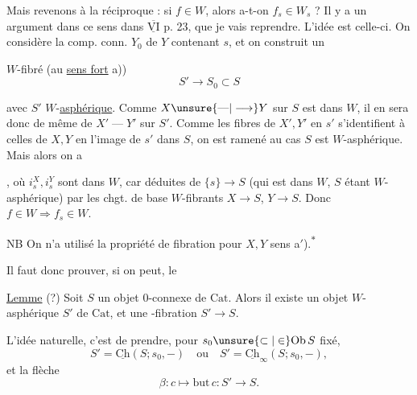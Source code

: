 Mais revenons à la réciproque : si $f\in W$, alors a-t-on $f_s\in W_s$ ? Il y a un argument dans ce sens dans $\overline{\underline{\mathrm{VI}}}$ p. 23, que je vais reprendre. L'idée  est celle-ci. On considère la comp. conn. $Y_0$ de $Y$ contenant $s$, et on  construit un


$W$-fibré (au \uline{sens fort} a))
\[
S'\longrightarrow S_0\subset S
\]

avec $S'$ $W$-\uline{asphérique}. Comme $X\unsure{\text{---}|\longrightarrow}Y$ sur $S$ est dans $W$, il en sera donc de même de $X'\mathrel{\text{---}}Y'$ sur $S'$.  Comme les fibres de $X',Y'$ en $s'$ s'identifient à celles de $X,Y$ en l'image de $s'$ dans $S$, on est ramené au cas  $S$  est $W$-asphérique. Mais alors on a


, où $i_s^X,i_s^Y$ sont dans $W$, car déduites de $\{s\}\longrightarrow S$ (qui est dans $W$, $S$ étant $W$-asphérique) par les chgt. de base $W$-fibrants $X\longrightarrow S$, $Y\longrightarrow S$. Donc $f\in W\Longrightarrow f_s\in W$.

NB On n'a utilisé la propriété de fibration pour $X,Y$  sens a$'$).\textsuperscript{$*$}


Il faut donc  prouver, si on peut, le

\uline{Lemme} (?) Soit $S$ un objet $0$-connexe de $\mathrm{Cat}$. Alors il existe un objet $W$-asphérique $S'$ de $\mathrm{Cat}$, et une -fibration  $S'\longrightarrow S$.


L'idée naturelle, c'est de prendre, pour $s_0\unsure{\subset|\in}\mathrm{Ob}\,S$ fixé,
\[
S'=\underline{\mathrm{Ch}}(S;s_0,-)\quad\text{ou}\quad S'=\underline{\mathrm{Ch}}_\infty(S;s_0,-),
\]
et la flèche
\[
\beta:c\longmapsto\mathrm{but}\,c:S'\longrightarrow S.
\]

